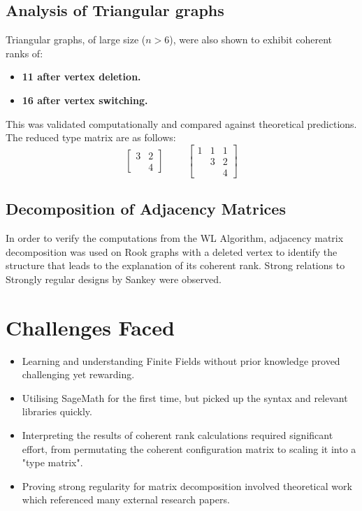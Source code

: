 \documentclass[12pt]{article}
\begin{document}
\subsection{Analysis of Triangular graphs}
Triangular graphs, of large size ($n > 6$), were also shown to exhibit coherent ranks of:
\begin{itemize}
    \item \textbf{11 after vertex deletion.}
    \item \textbf{16 after vertex switching.}
\end{itemize}
This was validated computationally and compared against theoretical predictions.
The reduced type matrix are as follows:
\[
\begin{bmatrix}
  3 & 2 \\
    & 4
\end{bmatrix}
\hspace{1cm}
\begin{bmatrix}
  1 & 1 & 1 \\
    & 3 & 2 \\
    &   & 4
\end{bmatrix}
\]

\subsection{Decomposition of Adjacency Matrices}
In order to verify the computations from the WL Algorithm, adjacency matrix decomposition was used on Rook graphs with a deleted vertex to identify the structure that leads to the explanation of its coherent rank. Strong relations to Strongly regular designs by Sankey were observed.

\section{Challenges Faced}
\begin{itemize}
    \item Learning and understanding Finite Fields without prior knowledge proved challenging yet rewarding.
    \item Utilising SageMath for the first time, but picked up the syntax and relevant libraries quickly.
    \item Interpreting the results of coherent rank calculations required significant effort, from permutating the coherent configuration matrix to scaling it into a "type matrix".
    \item Proving strong regularity for matrix decomposition involved theoretical work which referenced many external research papers.
\end{itemize}
\end{document}
